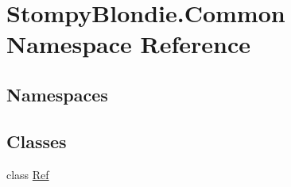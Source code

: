 \hypertarget{namespace_stompy_blondie_1_1_common}{}\section{Stompy\+Blondie.\+Common Namespace Reference}
\label{namespace_stompy_blondie_1_1_common}
\subsection*{Namespaces}
\begin{DoxyCompactItemize}
\end{DoxyCompactItemize}
\subsection*{Classes}
\begin{DoxyCompactItemize}
\item 
class \mbox{\hyperlink{class_stompy_blondie_1_1_common_1_1_ref}{Ref}}
\end{DoxyCompactItemize}
